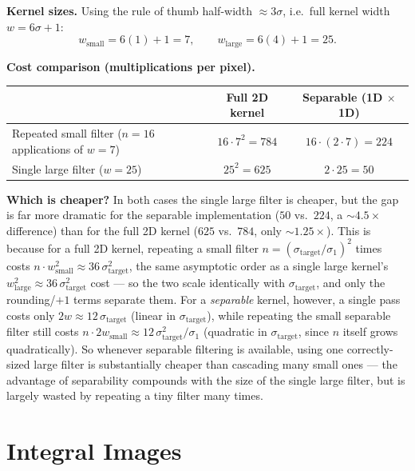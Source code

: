 \documentclass[11pt]{article}
\begin{document}
\textbf{Kernel sizes.} Using the rule of thumb half-width $\approx 3\sigma$, i.e.\ full kernel width $w = 6\sigma+1$:
\[
w_{\text{small}} = 6(1)+1 = 7, \qquad w_{\text{large}} = 6(4)+1 = 25.
\]

\textbf{Cost comparison (multiplications per pixel).}

\begin{table}[h]
\centering
\begin{tabular}{lcc}
\toprule
 & Full 2D kernel & Separable (1D $\times$ 1D) \\
\midrule
Repeated small filter ($n=16$ applications of $w=7$) & $16 \cdot 7^2 = 784$ & $16 \cdot (2\cdot 7) = 224$ \\
Single large filter ($w=25$) & $25^2 = 625$ & $2\cdot 25 = 50$ \\
\bottomrule
\end{tabular}
\end{table}

\textbf{Which is cheaper?} In both cases the single large filter is cheaper, but the gap is far more dramatic for the separable implementation ($50$ vs.\ $224$, a $\sim4.5\times$ difference) than for the full 2D kernel ($625$ vs.\ $784$, only $\sim1.25\times$). This is because for a full 2D kernel, repeating a small filter $n=(\sigma_{\text{target}}/\sigma_1)^2$ times costs $n\cdot w_{\text{small}}^2 \approx 36\,\sigma_{\text{target}}^2$, the same asymptotic order as a single large kernel's $w_{\text{large}}^2\approx 36\,\sigma_{\text{target}}^2$ cost --- so the two scale identically with $\sigma_{\text{target}}$, and only the rounding/$+1$ terms separate them. For a \emph{separable} kernel, however, a single pass costs only $2w\approx 12\,\sigma_{\text{target}}$ (linear in $\sigma_{\text{target}}$), while repeating the small separable filter still costs $n\cdot 2w_{\text{small}} \approx 12\,\sigma_{\text{target}}^2/\sigma_1$ (quadratic in $\sigma_{\text{target}}$, since $n$ itself grows quadratically). So whenever separable filtering is available, using one correctly-sized large filter is substantially cheaper than cascading many small ones --- the advantage of separability compounds with the size of the single large filter, but is largely wasted by repeating a tiny filter many times.

\section{Integral Images}
\end{document}
